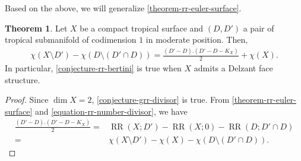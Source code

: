 \documentclass[a4paper,dvipdfmx,reqno,12pt]{amsart}
\theoremstyle{definition}
\newtheorem{theorem}{Theorem}[section]
\newcommand{\opn}[1]{\operatorname{#1}}
\numberwithin{equation}{section}
\begin{document}
Based on the above, we will generalize
\cref{theorem-rr-euler-surface}.

\begin{theorem}
\label{theorem-rr-bertini-surface}
Let $X$ be a compact tropical surface
and $(D,D')$ a pair of tropical submanifold of
codimension $1$ in moderate position. Then,
\begin{align}
\chi(X\setminus D')-\chi(D\setminus (D'\cap D))
=\frac{(D'-D).(D'-D-K_X)}{2}+\chi(X).
\end{align}
In particular, \cref{conjecture-rr-bertini} is true 
when $X$ admits a Delzant face structure.
\end{theorem}

\begin{proof}
Since $\dim X=2$, 
\cref{conjecture-grr-divisor} is true.
From \cref{theorem-rr-euler-surface} and 
\eqref{equation-rr-number-divisor}, we have
\begin{align}
\frac{(D'-D).(D'-D-K_X)}{2}=&
\opn{RR}(X;D')-\opn{RR}(X;0)-
\opn{RR}(D;D'\cap D) \\
=&\chi(X\setminus D')-\chi(X)-\chi(D\setminus (D'\cap D)).
\end{align}
\end{proof}
\end{document}
